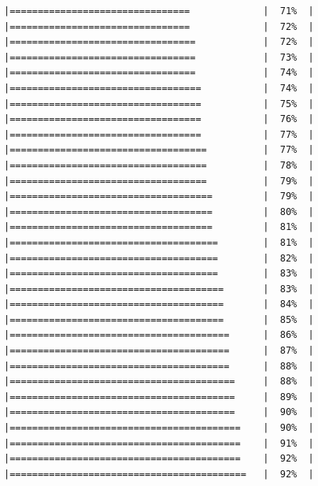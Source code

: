 \documentclass[
  krantz2]{krantz}
\begin{document}
\begin{verbatim}
|================================             |  71%  |                                                     |================================             |  72%  |                                                     |=================================            |  72%  |                                                     |=================================            |  73%  |                                                     |=================================            |  74%  |                                                     |==================================           |  74%  |                                                     |==================================           |  75%  |                                                     |==================================           |  76%  |                                                     |==================================           |  77%  |                                                     |===================================          |  77%  |                                                     |===================================          |  78%  |                                                     |===================================          |  79%  |                                                     |====================================         |  79%  |                                                     |====================================         |  80%  |                                                     |====================================         |  81%  |                                                     |=====================================        |  81%  |                                                     |=====================================        |  82%  |                                                     |=====================================        |  83%  |                                                     |======================================       |  83%  |                                                     |======================================       |  84%  |                                                     |======================================       |  85%  |                                                     |=======================================      |  86%  |                                                     |=======================================      |  87%  |                                                     |=======================================      |  88%  |                                                     |========================================     |  88%  |                                                     |========================================     |  89%  |                                                     |========================================     |  90%  |                                                     |=========================================    |  90%  |                                                     |=========================================    |  91%  |                                                     |=========================================    |  92%  |                                                     |==========================================   |  92%  |                        
\end{verbatim}
\end{document}
